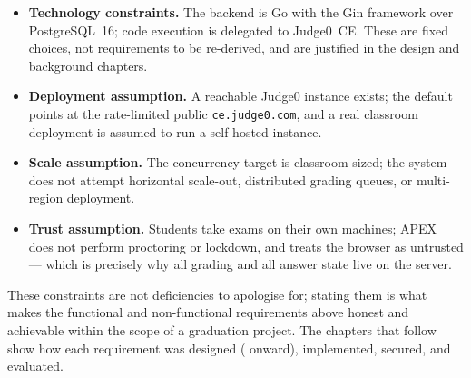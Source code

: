 \begin{itemize}[leftmargin=1.4em]
  \item \textbf{Technology constraints.} The backend is Go with the Gin framework over
        PostgreSQL~16; code execution is delegated to Judge0~CE. These are fixed choices,
        not requirements to be re-derived, and are justified in the design and background
        chapters.
  \item \textbf{Deployment assumption.} A reachable Judge0 instance exists; the default
        points at the rate-limited public \texttt{ce.judge0.com}, and a real classroom
        deployment is assumed to run a self-hosted instance.
  \item \textbf{Scale assumption.} The concurrency target is classroom-sized; the system
        does not attempt horizontal scale-out, distributed grading queues, or multi-region
        deployment.
  \item \textbf{Trust assumption.} Students take exams on their own machines; APEX does
        not perform proctoring or lockdown, and treats the browser as untrusted --- which
        is precisely why all grading and all answer state live on the server.
\end{itemize}

These constraints are not deficiencies to apologise for; stating them is what makes the
functional and non-functional requirements above honest and achievable within the scope
of a graduation project. The chapters that follow show how each requirement was designed
( onward), implemented, secured, and evaluated.
